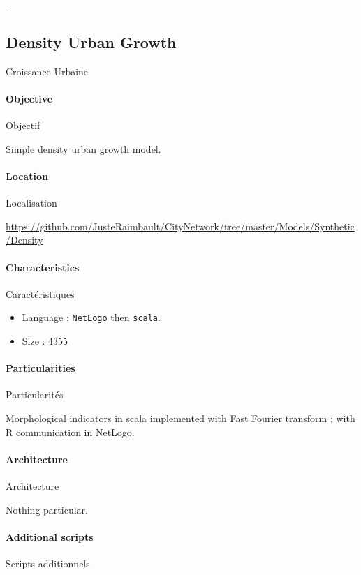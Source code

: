 -





\subsection{Density Urban Growth}{Croissance Urbaine}

\paragraph{Objective}{Objectif}

Simple density urban growth model.

\paragraph{Location}{Localisation}

\url{https://github.com/JusteRaimbault/CityNetwork/tree/master/Models/Synthetic/Density}

\paragraph{Characteristics}{Caractéristiques}

\begin{itemize}
\item Language : \texttt{NetLogo} then \texttt{scala}.
\item Size : 4355
\end{itemize}


\paragraph{Particularities}{Particularités}

Morphological indicators in scala implemented with Fast Fourier transform ; with R communication in NetLogo.

\paragraph{Architecture}{Architecture}

Nothing particular.

\paragraph{Additional scripts}{Scripts additionnels}

